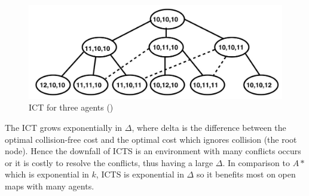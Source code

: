 \documentclass[a4paper,11pt]{article}
\begin{document}
\begin{figure}[!htb]
	\centering
	\centering
	\includegraphics[width=0.9\linewidth]{graphics/ictstree}
	\caption{ICT for three agents (\cite{sharon2011increasing})}
	\label{fig:increasingcosttree}
\end{figure}

The ICT grows exponentially in $\Delta$, where delta is the difference between the optimal collision-free cost and the optimal cost which ignores collision (the root node). Hence the downfall of ICTS is an environment with many conflicts occurs or it is costly to resolve the conflicts, thus having a large $\Delta$. In comparison to $A*$ which is exponential in $k$, ICTS is exponential in $\Delta$ so it benefits most on open maps with many agents.

%
%
%
%

%
%
\end{document}
